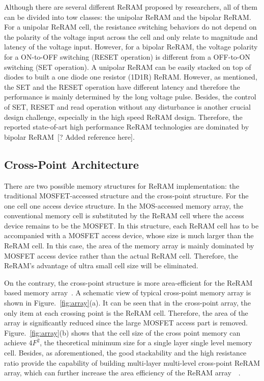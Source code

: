 Although there are several different ReRAM proposed by researchers, all of them can be divided into tow classes: the unipolar ReRAM and the bipolar ReRAM. For a unipolar ReRAM cell, the resistance switching behaviors do not depend on the polarity of the voltage input across the cell and only relate to magnitude and latency of the voltage input. However, for a bipolar ReRAM, the voltage polarity for a ON-to-OFF switching (RESET operation) is different from a OFF-to-ON switching (SET operation). A unipolar ReRAM can be easily stacked on top of diodes to built a one diode one resistor (1D1R) ReRAM. However, as mentioned, the SET and the RESET operation have different latency and therefore the performance is mainly determined by the long voltage pulse. Besides, the control of SET, RESET and read operation without any disturbance is another crucial design challenge, especially in the high speed ReRAM design. Therefore, the reported state-of-art high performance ReRAM technologies are dominated by bipolar ReRAM~[? Added reference here].

\subsection{Cross-Point Architecture}
There are two possible memory structures for ReRAM implementation: the traditional MOSFET-accessed structure and the cross-point structure. For the one cell one access device structure. In the MOS-accessed memory array, the conventional memory cell is substituted by the ReRAM cell where the access device remains to be the MOSFET. In this structure, each ReRAM cell has to be accompanied with a MOSFET access device, whose size is much larger than the ReRAM cell. In this case, the area of the memory array is mainly dominated by MOSFET access device rather than the actual ReRAM cell. Therefore, the ReRAM's advantage of ultra small cell size will be eliminated. 

On the contrary, the cross-point structure is more area-efficient for the ReRAM based memory array~\cite{memristor:Cong}. A schematic view of typical cross-point memory array is shown in Figure.~\ref{fig:array}(a). It can be seen that in the cross-point array, the only item at each crossing point is the ReRAM cell. Therefore, the area of the array is significantly reduced since the large MOSFET access part is removed. Figure.~\ref{fig:array}(b) shows that the cell size of the cross point memory can achieve $4F^2$, the theoretical minimum size for a single layer single level memory cell. Besides, as aforementioned, the good stackability and the high resistance ratio provide the capability of building multi-layer multi-level cross-point ReRAM array, which can further increase the area efficiency of the  ReRAM array~\cite{memristor:ISSCC2011_ITRI}~\cite{memristor:IEDM08_3D}.

